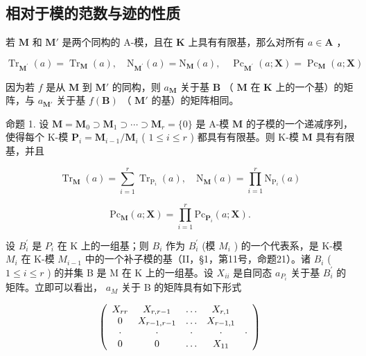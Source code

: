 \subsection{相对于模的范数与迹的性质}

若 \(\mathbf{M}\) 和 \(\mathbf{M}'\) 是两个同构的 A-模，且在 \(\mathbf{K}\) 上具有有限基，那么对所有 \(a \in \mathbf{A}\) ，

\[
\operatorname{Tr} _ {\mathbf {M} ^ {\prime}} (a) = \operatorname{Tr} _ {\mathbf {M}} (a), \quad \mathrm{N} _ {\mathbf {M} ^ {\prime}} (a) = \mathrm{N} _ {\mathbf {M}} (a), \quad \operatorname{Pc} _ {\mathbf {M} ^ {\prime}} (a; \mathbf {X}) = \operatorname{Pc} _ {\mathbf {M}} (a; \mathbf {X})\tag{14}
\]

因为若 \(f\) 是从 \(\mathbf{M}\) 到 \(\mathbf{M}'\) 的同构，则 \(a_{\mathbf{M}}\) 关于基 \(\mathbf{B}\) （ \(\mathbf{M}\) 在 \(\mathbf{K}\) 上的一个基）的矩阵，与 \(a_{\mathbf{M}'}\) 关于基 \(f(\mathbf{B})\) （ \(\mathbf{M}'\) 的基）的矩阵相同。

命题 1. 设 \(\mathbf{M} = \mathbf{M}_0 \supset \mathbf{M}_1 \supset \cdots \supset \mathbf{M}_r = \{0\}\) 是 A-模 \(\mathbf{M}\) 的子模的一个递减序列，使得每个 K-模 \(\mathbf{P}_i = \mathbf{M}_{i-1} / \mathbf{M}_i\) ( \(1 \leqslant i \leqslant r\) ) 都具有有限基。则 K-模 \(\mathbf{M}\) 具有有限基，并且

\[
\operatorname{Tr} _ {\mathbf {M}} (a) = \sum_ {i = 1} ^ {r} \operatorname{Tr} _ {\mathrm{P} _ {i}} (a), \quad \mathrm{N} _ {\mathbf {M}} (a) = \prod_ {i = 1} ^ {r} \mathrm{N} _ {\mathrm{P} _ {i}} (a)\tag{15}
\]

\[
\mathrm{Pc} _ {\mathbf {M}} (a; \mathbf {X}) = \prod_ {i = 1} ^ {r} \mathrm{Pc} _ {\mathbf {P} _ {i}} (a; \mathbf {X}).
\]

设 \(B_{i}^{\prime}\) 是 \(P_{i}\) 在 K 上的一组基；则 \(B_{i}\) 作为 \(B_{i}^{\prime}\) (模 \(M_{i}\) ) 的一个代表系，是 K-模 \(M_{i}\) 在 K-模 \(M_{i-1}\) 中的一个补子模的基（II，§1，第11号，命题21）。诸 \(B_{i}\) ( \(1 \leqslant i \leqslant r\) ) 的并集 B 是 M 在 K 上的一组基。设 \(X_{ii}\) 是自同态 \(a_{P_{i}}\) 关于基 \(B_{i}^{\prime}\) 的矩阵。立即可以看出， \(a_{M}\) 关于 B 的矩阵具有如下形式

\[
\left( \begin{array}{c c c c c} X _ {r r} & X _ {r, r - 1} & \ldots & X _ {r, 1} \\ 0 & X _ {r - 1, r - 1} & \ldots & X _ {r - 1, 1} \\ \cdot & \cdot & \cdot & \cdot & \cdot \\ 0 & 0 & \ldots & X _ {1 1} \end{array} \right)
\]

